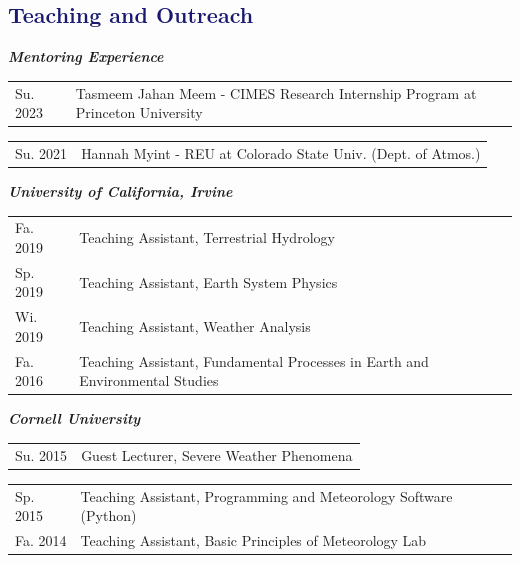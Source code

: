 \documentclass[margin,line,palatino,courier,10pt]{res}
\begin{document}
\begin{resume}
\section{\sc \textcolor{MidnightBlue}{\large{\textbf{Teaching and Outreach}}}}

\textit{\textbf{Mentoring Experience}}
\vspace*{0.05in}\\
\begin{tabular}{@{}p{0.9in}p{4in}}
Su. 2023 & Tasmeem Jahan Meem - CIMES Research Internship Program at Princeton University\\
\end{tabular}
\begin{tabular}{@{}p{0.9in}p{4in}}
Su. 2021 & Hannah Myint - REU at Colorado State Univ. (Dept. of Atmos.)
\end{tabular}

\textit{\textbf{University of California, Irvine}}
\vspace*{0.05in}\\
\begin{tabular}{@{}p{0.9in}p{4in}}
Fa. 2019 & Teaching Assistant, Terrestrial Hydrology\\
Sp. 2019 & Teaching Assistant, Earth System Physics\\
Wi. 2019 & Teaching Assistant, Weather Analysis\\
Fa. 2016 & Teaching Assistant, Fundamental Processes in Earth and Environmental Studies\\
\end{tabular}

\textit{\textbf{Cornell University}}
\vspace*{0.05in}\\
\begin{tabular}{@{}p{0.9in}p{4in}}
Su. 2015 & Guest Lecturer, Severe Weather Phenomena\\
\end{tabular}
\begin{tabular}{@{}p{0.9in}p{4in}}
Sp. 2015 & Teaching Assistant, Programming and Meteorology Software (Python)\\
Fa. 2014 & Teaching Assistant, Basic Principles of Meteorology Lab\\
\end{tabular}


\end{resume}
\end{document}
